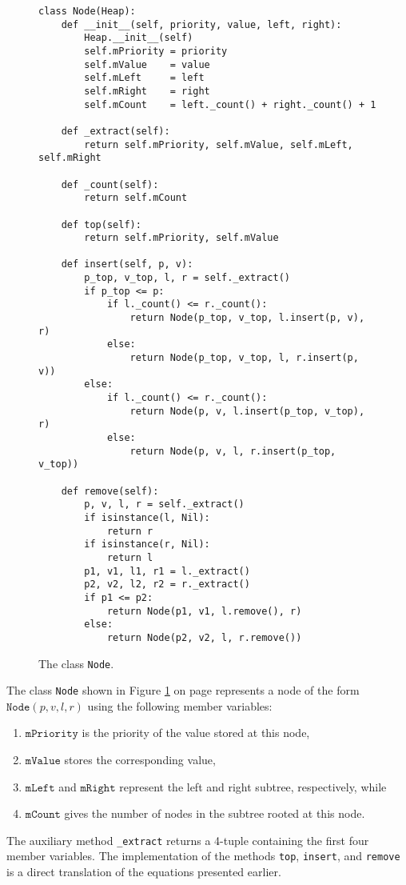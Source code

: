 \begin{figure}[!ht]
\centering
\begin{verbatim}
class Node(Heap):
    def __init__(self, priority, value, left, right):
        Heap.__init__(self)
        self.mPriority = priority
        self.mValue    = value
        self.mLeft     = left
        self.mRight    = right
        self.mCount    = left._count() + right._count() + 1
        
    def _extract(self):
        return self.mPriority, self.mValue, self.mLeft, self.mRight
    
    def _count(self):
        return self.mCount
    
    def top(self):
        return self.mPriority, self.mValue

    def insert(self, p, v):
        p_top, v_top, l, r = self._extract()
        if p_top <= p:
            if l._count() <= r._count():
                return Node(p_top, v_top, l.insert(p, v), r)
            else:
                return Node(p_top, v_top, l, r.insert(p, v))
        else:
            if l._count() <= r._count():
                return Node(p, v, l.insert(p_top, v_top), r)
            else:
                return Node(p, v, l, r.insert(p_top, v_top))    

    def remove(self):
        p, v, l, r = self._extract()
        if isinstance(l, Nil):
            return r
        if isinstance(r, Nil):
            return l
        p1, v1, l1, r1 = l._extract()
        p2, v2, l2, r2 = r._extract()
        if p1 <= p2:
            return Node(p1, v1, l.remove(), r)
        else:
            return Node(p2, v2, l, r.remove())
\end{verbatim}
\vspace*{-0.3cm}
\caption{The class \texttt{Node}.}
\label{fig:Heap.ipynb:Node}
\end{figure}


The class \texttt{Node} shown in Figure \ref{fig:Heap.ipynb:Node} on page \pageref{fig:Heap.ipynb:Node}
represents a node of the form $\texttt{Node}(p, v, l, r)$ using the following member variables:
\begin{enumerate}
\item $\texttt{mPriority}$ is the priority of the value stored at this node,
\item $\texttt{mValue}$    stores the corresponding value,
\item $\texttt{mLeft}$ and $\texttt{mRight}$ represent the left and right subtree, respectively, while
\item $\texttt{mCount}$    gives the number of nodes in the subtree rooted at this node.
\end{enumerate}
The auxiliary method \texttt{\_extract} returns a 4-tuple containing the first four member variables.
The implementation of the methods \texttt{top}, \texttt{insert}, and \texttt{remove} is a direct translation of
the equations presented earlier.

